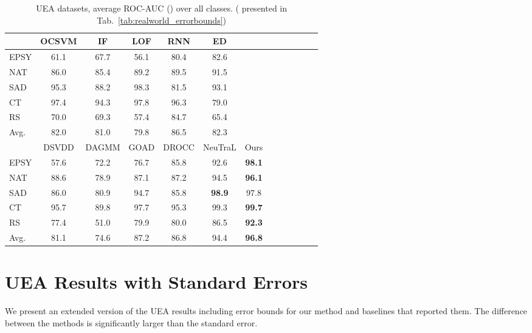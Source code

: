 \documentclass{article}
\begin{document}
\begin{table*}
\caption{UEA datasets, average ROC-AUC () over all classes. ( presented in Tab.~\ref{tab:realworld_errorbounds})}
\centering
\small
\begin{tabular}{lcccccccccccc}
\toprule


&	OCSVM	&	IF	&	LOF	&	RNN	&	ED	\\
\midrule

EPSY	& 61.1	&	67.7	&	56.1	&	80.4	&	82.6 \\
NAT	& 86.0	&	85.4	&	89.2	&	89.5	&	91.5 \\
SAD	&  95.3	&	88.2	&	98.3	&	81.5	&	93.1 \\
CT	& 97.4	&	94.3	&	97.8	&	96.3	&	79.0 \\
RS	&  70.0	&	69.3	&	57.4	&	84.7	&	65.4 \\
\midrule
Avg.	&  82.0	&	81.0	&	79.8	&	86.5	&	82.3	\\
\midrule
	&	DSVDD	& DAGMM		&	GOAD	&	DROCC	&	NeuTraL	&	Ours	\\ \midrule
EPSY	&	57.6	& 72.2  &	76.7	&	85.8	&	92.6	&	\textbf{98.1}	\\
NAT		&	88.6 & 78.9	& 	87.1	&	87.2	&	94.5	&	\textbf{96.1}	\\
SAD		&	86.0 & 80.9	& 	94.7	&	85.8	&	\textbf{98.9}	&	97.8	\\
CT		&	95.7 & 89.8	& 	97.7	&	95.3	&	99.3	&	\textbf{99.7}	\\
RS		&	77.4 & 51.0	& 	79.9	&	80.0	&	86.5	& \textbf{92.3}		\\ \midrule
Avg.	&		81.1 & 74.6 	&	87.2	&	86.8	&	94.4	&	\textbf{96.8}	\\




\bottomrule
\end{tabular}
\label{tab:realworld_supp}
\end{table*}



\section{UEA Results with Standard Errors}
\label{app:extended_uea_bounds}

We present an extended version of the UEA results including error bounds for our method and baselines that reported them. The difference between the methods is significantly larger than the standard error.
\end{document}
